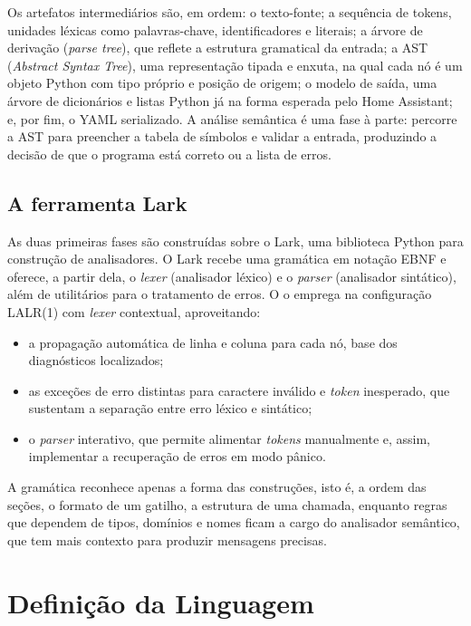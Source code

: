 \documentclass[12pt]{article}
\renewcommand\texttt[1]{\svtt{\small#1}}
\begin{document}
Os artefatos intermediários são, em ordem: o texto-fonte; a sequência de tokens, unidades léxicas como
palavras-chave, identificadores e literais; a árvore de derivação
(\emph{parse tree}), que reflete a estrutura gramatical da
entrada; a AST (\emph{Abstract Syntax Tree}), uma representação
tipada e enxuta, na qual cada nó é um objeto Python com tipo próprio e
posição de origem; o modelo de saída, uma árvore de dicionários e listas
Python já na forma esperada pelo Home Assistant; e, por fim, o YAML
serializado. A análise semântica é uma fase à parte: percorre a AST para
preencher a tabela de símbolos e validar a entrada, produzindo a decisão de que o programa está correto ou a
lista de erros.

\subsection{A ferramenta Lark}

As duas primeiras fases são construídas sobre o Lark, uma biblioteca
Python para construção de analisadores. O Lark recebe uma gramática em
notação EBNF e oferece, a partir dela, o \emph{lexer} (analisador
léxico) e o \emph{parser} (analisador sintático), além de utilitários
para o tratamento de erros. O \texttt{jass} o emprega na configuração
LALR(1) com \emph{lexer} contextual, aproveitando:

\begin{itemize}
\tightlist
\item
  a propagação automática de linha e coluna para cada nó, base dos
  diagnósticos localizados;
\item
  as exceções de erro distintas para caractere inválido e \emph{token}
  inesperado, que sustentam a separação entre erro léxico e sintático;
\item
  o \emph{parser} interativo, que permite alimentar \emph{tokens}
  manualmente e, assim, implementar a recuperação de erros em modo
  pânico.
\end{itemize}

A gramática reconhece apenas a forma das construções, isto é, a ordem das
seções, o formato de um gatilho, a estrutura de uma chamada, enquanto
regras que dependem de tipos, domínios e nomes ficam a cargo do
analisador semântico, que tem mais contexto para produzir mensagens
precisas.

\section{Definição da Linguagem}
\end{document}
